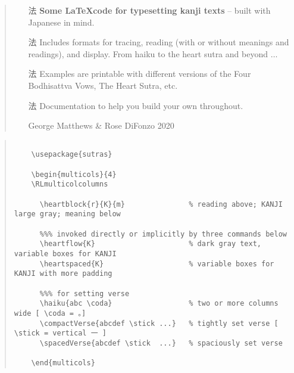 \documentclass[letterpaper]{article}
\begin{document}
	\vspace*{3cm}
	

\vspace*{2cm}
	    \begin{quote}
	    	\begin{itemize}
	    		\item[法]  \textbf{Some \LaTeX code for typesetting kanji texts} -- built with Japanese in mind.
	    		\item[法] Includes formats for tracing, reading (with or without meanings and readings), and display. From haiku to the heart sutra and beyond $\ldots$
	    		\item[法] Examples are printable with different versions of the Four Bodhisattva Vows, The Heart Sutra, etc.
	    		\item[法] Documentation to help you build your own throughout.
	    		\item[] \cc George Matthews \& Rose DiFonzo 2020
	    	\end{itemize}
	    \end{quote}
	    
	    
	    
\vspace*{1cm}
	
	\begin{quotation}
		
	\begin{verbatim}
	
	\usepackage{sutras}
	
	\begin{multicols}{4}
	\RLmulticolcolumns
	
	  \heartblock{r}{K}{m}               % reading above; KANJI large gray; meaning below
	
	  %%% invoked directly or implicitly by three commands below
	  \heartflow{K}                      % dark gray text, variable boxes for KANJI 
	  \heartspaced{K}                    % variable boxes for KANJI with more padding
	  
	  %%% for setting verse
	  \haiku{abc \coda}                  % two or more columns wide [ \coda = 。]
	  \compactVerse{abcdef \stick ...}   % tightly set verse [ \stick = vertical 一 ]
	  \spacedVerse{abcdef \stick  ...}   % spaciously set verse
	
	\end{multicols}
	\end{verbatim}
	
\end{quotation}
	
\end{document}
